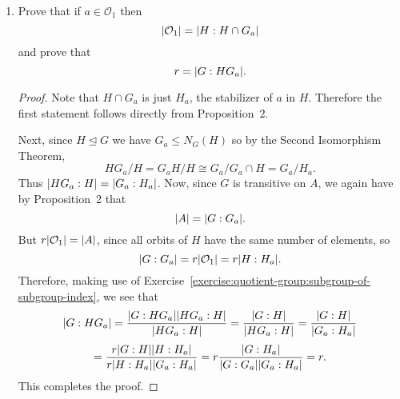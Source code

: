 \begin{enumerate}
\begin{proof}
    Finally, since $G$ is transitive on the orbits of $H$, there is
    $g\in G$ such that $g\mathcal{O}_i = \mathcal{O}_j$. Then the map
    $\varphi\colon\mathcal{O}_i\to\mathcal{O}_j$ given by
    \begin{equation*}
      \varphi(a) = g\cdot a
    \end{equation*}
    is a bijection, since it admits the inverse
    \begin{equation*}
      \varphi^{-1}(b) = g^{-1}\cdot b.
    \end{equation*}
    Therefore all orbits of $H$ have the same cardinality.
  \end{proof}

\item Prove that if $a\in\mathcal{O}_1$ then
  \begin{equation*}
    \lvert{\mathcal{O}_1}\rvert = \lvert{H : H\cap G_a}\rvert
  \end{equation*}
  and prove that
  \begin{equation*}
    r = \lvert{G : HG_a}\rvert.
  \end{equation*}
  \begin{proof}
    Note that $H\cap G_a$ is just $H_a$, the stabilizer of $a$ in
    $H$. Therefore the first statement follows directly from
    Proposition~2.

    Next, since $H\trianglelefteq G$ we have $G_a\leq N_G(H)$ so by
    the Second Isomorphism Theorem,
    \begin{equation*}
      HG_a/H = G_aH/H \cong G_a/G_a\cap H = G_a/H_a.
    \end{equation*}
    Thus $\lvert{HG_a : H}\rvert = \lvert{G_a : H_a}\rvert$. Now, since $G$ is
    transitive on $A$, we again have by Proposition~2 that
    \begin{equation*}
      \lvert{A}\rvert = \lvert{G : G_a}\rvert.
    \end{equation*}
    But $r\lvert{\mathcal{O}_1}\rvert = \lvert{A}\rvert$, since all orbits of $H$ have
    the same number of elements, so
    \begin{equation*}
      \lvert{G : G_a}\rvert = r\lvert{\mathcal{O}_1}\rvert = r\lvert{H : H_a}\rvert.
    \end{equation*}
    Therefore, making use of
    Exercise~\ref{exercise:quotient-group:subgroup-of-subgroup-index},
    we see that
    \begin{multline*}
      \lvert{G : HG_a}\rvert
      = \frac{\lvert{G : HG_a}\rvert\lvert{HG_a : H}\rvert}{\lvert{HG_a : H}\rvert}
      = \frac{\lvert{G : H}\rvert}{\lvert{HG_a : H}\rvert}
      = \frac{\lvert{G : H}\rvert}{\lvert{G_a : H_a}\rvert} \\[3pt]
      = \frac{r\lvert{G : H}\rvert\lvert{H : H_a}\rvert}{r\lvert{H : H_a}\rvert\lvert{G_a : H_a}\rvert}
      = r\frac{\lvert{G : H_a}\rvert}{\lvert{G : G_a}\rvert\lvert{G_a : H_a}\rvert}
      = r.
    \end{multline*}
    This completes the proof.
  \end{proof}
\end{enumerate}
